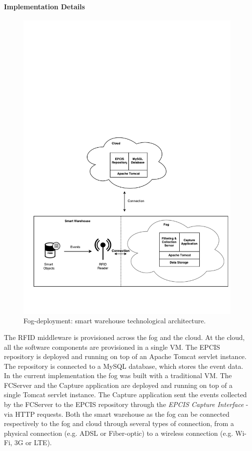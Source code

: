 \paragraph{Implementation Details}
\label{par:imp_smart_warehouse_fog}

\begin{figure}[ht!]
\centering
\includegraphics[width=.5\textwidth]{./figures/implementation_fog_architecture}
\caption{Fog-deployment: smart warehouse technological architecture.}
\label{fig:implementation_fog_architecture}
\end{figure}

The \gls{RFID} middleware is provisioned across the fog and the cloud. At the cloud,
all the software components are provisioned in a single \gls{VM}. The \gls{EPCIS} repository is deployed
and running on top of an Apache Tomcat servlet instance. The repository is connected to a MySQL
database, which stores the event data. In the current implementation the fog was built with a traditional
\gls{VM}. The \gls{FCServer} and the Capture application are deployed and running on top of a single
Tomcat servlet instance. The Capture application sent the events collected by the \gls{FCServer} to
the \gls{EPCIS} repository through the \textit{\gls{EPCIS} Capture Interface} - via \gls{HTTP} requests.
Both the smart warehouse as the fog can be connected respectively to the fog and cloud through several
types of connection, from a physical connection (e.g. \gls{ADSL} or Fiber-optic) to a wireless connection
(e.g. Wi-Fi, 3G or \gls{LTE}).
